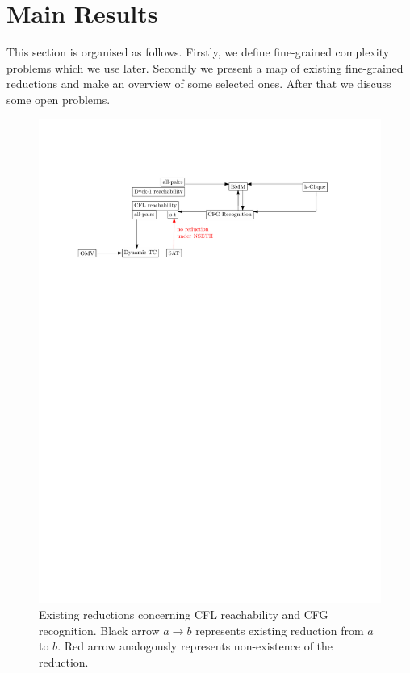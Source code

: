 \documentclass[acmsmall,review,nonacm]{acmart}\settopmatter{printfolios=true,printccs=false,printacmref=false}
\begin{document}
	
	\section{Main Results}
	
	This section is organised as follows. Firstly, we define fine-grained complexity problems which we use later. Secondly we present a map of existing fine-grained reductions and make an overview of some selected ones. After that we discuss some open problems. 
	
	\begin{figure}[!htp]
		
		\begin{center}  
			\includegraphics[scale = 0.6]{map_popl.pdf}
		\end{center}
		
		\caption{Existing reductions concerning CFL reachability and CFG recognition. Black arrow $a \rightarrow b$ represents existing reduction from $a$ to $b$. Red arrow analogously represents non-existence of the reduction. }
		\label{fig:map}
		
	\end{figure}
	
\end{document}
